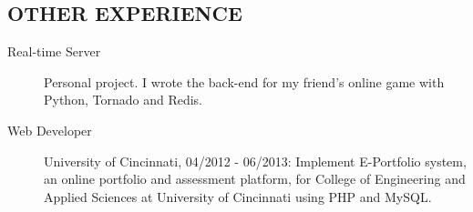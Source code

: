 \documentclass[line]{res}
\begin{document}
\begin{resume}
	\section{OTHER EXPERIENCE}
	\begin{description}
		\item[Real-time Server] Personal project. I wrote the back-end for my friend's online game with Python, Tornado and Redis.
		\item[Web Developer] University of Cincinnati, 04/2012 - 06/2013: Implement E-Portfolio system, an online portfolio and assessment platform, for College of Engineering and Applied Sciences at University of Cincinnati using PHP and MySQL. 
	\end{description}

\end{resume}
\end{document}

